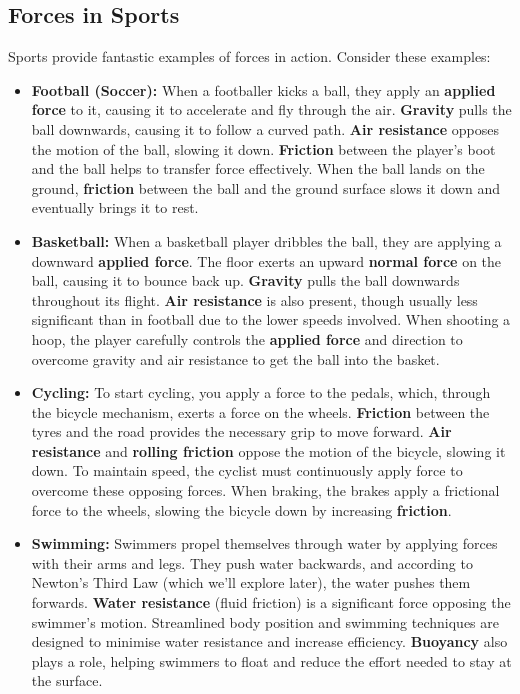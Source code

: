 \subsection{Forces in Sports}

Sports provide fantastic examples of forces in action.  Consider these examples:

\begin{itemize}
    \item \textbf{Football (Soccer):} When a footballer kicks a ball, they apply an \textbf{applied force} to it, causing it to accelerate and fly through the air. \textbf{Gravity} pulls the ball downwards, causing it to follow a curved path.  \textbf{Air resistance} opposes the motion of the ball, slowing it down. \textbf{Friction} between the player's boot and the ball helps to transfer force effectively. When the ball lands on the ground, \textbf{friction} between the ball and the ground surface slows it down and eventually brings it to rest.

    \item \textbf{Basketball:}  When a basketball player dribbles the ball, they are applying a downward \textbf{applied force}. The floor exerts an upward \textbf{normal force} on the ball, causing it to bounce back up.  \textbf{Gravity} pulls the ball downwards throughout its flight. \textbf{Air resistance} is also present, though usually less significant than in football due to the lower speeds involved. When shooting a hoop, the player carefully controls the \textbf{applied force} and direction to overcome gravity and air resistance to get the ball into the basket.

    \item \textbf{Cycling:} To start cycling, you apply a force to the pedals, which, through the bicycle mechanism, exerts a force on the wheels.  \textbf{Friction} between the tyres and the road provides the necessary grip to move forward.  \textbf{Air resistance} and \textbf{rolling friction} oppose the motion of the bicycle, slowing it down.  To maintain speed, the cyclist must continuously apply force to overcome these opposing forces. When braking, the brakes apply a frictional force to the wheels, slowing the bicycle down by increasing \textbf{friction}.

    \item \textbf{Swimming:}  Swimmers propel themselves through water by applying forces with their arms and legs. They push water backwards, and according to Newton's Third Law (which we'll explore later), the water pushes them forwards.  \textbf{Water resistance} (fluid friction) is a significant force opposing the swimmer's motion.  Streamlined body position and swimming techniques are designed to minimise water resistance and increase efficiency.  \textbf{Buoyancy} also plays a role, helping swimmers to float and reduce the effort needed to stay at the surface.
\end{itemize}

